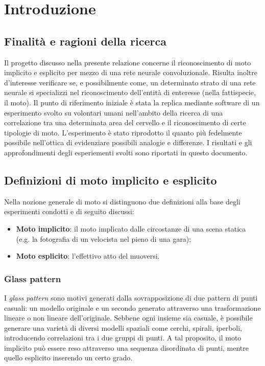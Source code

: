 
\chapter{Introduzione}

\section{Finalità e ragioni della ricerca}

Il progetto discusso nella presente relazione concerne il riconoscimento di moto implicito e esplicito per mezzo di una rete neurale convoluzionale. Risulta inoltre d'interesse verificare se, e possibilmente come, un determinato strato di una rete neurale si specializzi nel riconoscimento dell'entità di enteresse (nella fattispecie, il moto). Il punto di riferimento iniziale è stata la replica mediante software di un esperimento svolto su volontari umani nell'ambito della ricerca di una correlazione tra una determinata area del cervello e il riconoscimento di certe tipologie di moto. L'esperimento è stato riprodotto il quanto più fedelmente possibile nell'ottica di evidenziare possibili analogie e differenze. I risultati e gli approfondimenti degli esperiementi svolti sono riportati in questo documento.

\section{Definizioni di moto implicito e esplicito}

Nella nozione generale di moto si distinguono due definizioni alla base degli esperimenti condotti e di seguito discussi:
\begin{itemize}
	\item \textbf{Moto implicito}: il moto implicato dalle circostanze di una scena statica (e.g. la fotografia di un velocista nel pieno di una gara);
	\item \textbf{Moto esplicito}: l'effettivo atto del muoversi.
\end{itemize}

\subsection{Glass pattern}

I \textit{glass pattern} sono motivi generati dalla sovrapposizione di due pattern di punti casuali: un modello originale e un secondo generato attraverso una trasformazione lineare o non lineare dell'originale. Sebbene ogni insieme sia casuale, è possibile generare una varietà di diversi modelli spaziali come cerchi, spirali, iperboli, introducendo correlazioni tra i due gruppi di punti. A tal proposito, il moto implicito può essere reso attraverso una sequenza disordinata di punti, mentre quello esplicito inserendo un certo grado. \\

